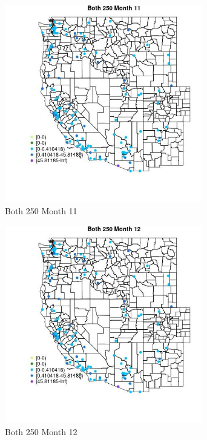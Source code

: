\begin{figure} 
\centering  
\includegraphics[width=0.77\textwidth]{Code_Outputs/Report_ML_input_PM25_Step4_part_e_de_duplicated_aves_MapObsMo11Both_250.jpg} 
\caption{\label{fig:Report_ML_input_PM25_Step4_part_e_de_duplicated_avesMapObsMo11Both_250}Both 250 Month 11} 
\end{figure} 
 

\begin{figure} 
\centering  
\includegraphics[width=0.77\textwidth]{Code_Outputs/Report_ML_input_PM25_Step4_part_e_de_duplicated_aves_MapObsMo12Both_250.jpg} 
\caption{\label{fig:Report_ML_input_PM25_Step4_part_e_de_duplicated_avesMapObsMo12Both_250}Both 250 Month 12} 
\end{figure} 
 

